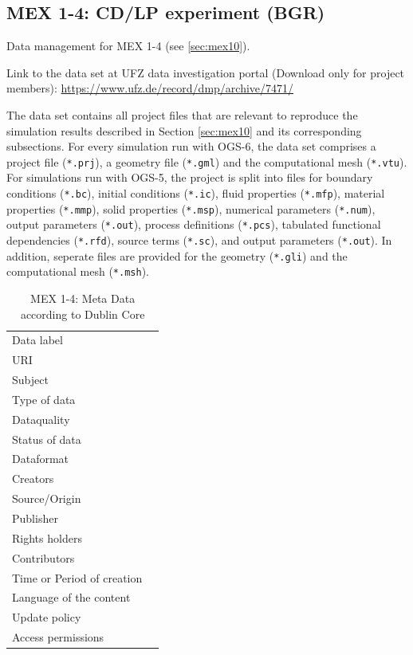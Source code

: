 \subsection{MEX 1-4: CD/LP experiment (BGR)}

Data management for MEX 1-4 (see \ref{sec:mex10}).

Link to the data set at UFZ data investigation portal (Download only for project members):
\hyperlink{https://www.ufz.de/record/dmp/archive/7471/}{https://www.ufz.de/record/dmp/archive/7471/}

The data set contains all project files that are relevant to reproduce the simulation results described in Section \ref{sec:mex10} and its corresponding subsections. For every simulation run with OGS-6, the data set comprises a project file (\texttt{*.prj}), a geometry file (\texttt{*.gml}) and the computational mesh (\texttt{*.vtu}). For simulations run with OGS-5, the project is split into files for boundary conditions (\texttt{*.bc}), initial conditions (\texttt{*.ic}), fluid properties (\texttt{*.mfp}), material properties (\texttt{*.mmp}), solid properties (\texttt{*.msp}), numerical parameters (\texttt{*.num}), output parameters (\texttt{*.out}), process definitions (\texttt{*.pcs}), tabulated functional dependencies (\texttt{*.rfd}), source terms (\texttt{*.sc}), and output parameters (\texttt{*.out}). In addition, seperate files are provided for the geometry (\texttt{*.gli}) and the computational mesh (\texttt{*.msh}).

\begin{table}[!ht]
\caption{MEX 1-4: Meta Data according to Dublin Core}
\label{tab:dms-mex1-4}
\small
\begin{tabular}{R{3cm}|L{7cm}}
\hline
%
Data label &  \\
URI &  \\
Subject  &  \\
Type of data  &  \\
Dataquality  &  \\
Status of data  &  \\
Dataformat  & \\
Creators  &  \\
Source/Origin &  \\
Publisher  &  \\
Rights holders &  \\
Contributors &  \\
Time or Period of creation &  \\
Language of the content &  \\
Update policy &  \\
Access permissions &  \\
%
\hline
\end{tabular}
\end{table}

